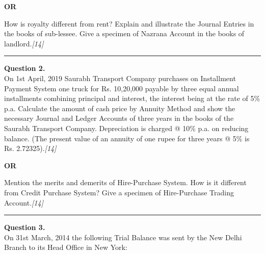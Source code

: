 \documentclass[11pt,a4paper]{article}
\newcommand{\pts}[1]{\hfill   \textit{[#1]}}
\begin{document}
\centerline{   \textbf{OR}}

How is royalty different from rent? Explain and illustrate the Journal Entries in the books of sub-lessee. Give a specimen of Nazrana Account in the books of landlord.\pts{14}

\medskip\rule{\linewidth}{0.2pt}




\noindent   \textbf{Question 2.} \\
On 1st April, 2019 Saurabh Transport Company purchases on Installment Payment System one truck for Rs. 10,20,000 payable by three equal annual installments combining principal and interest, the interest being at the rate of 5\% p.a. Calculate the amount of cash price by Annuity Method and show the necessary Journal and Ledger Accounts of three years in the books of the Saurabh Transport Company. Depreciation is charged @ 10\% p.a. on reducing balance. (The present value of an annuity of one rupee for three years @ 5\% is Rs. 2.72325).\pts{14}

\centerline{   \textbf{OR}}

Mention the merits and demerits of Hire-Purchase System. How is it different from Credit Purchase System? Give a specimen of Hire-Purchase Trading Account.\pts{14}

\medskip\rule{\linewidth}{0.2pt}




\noindent   \textbf{Question 3.} \\
On 31st March, 2014 the following Trial Balance was sent by the New Delhi Branch to its Head Office in New York:
\end{document}

